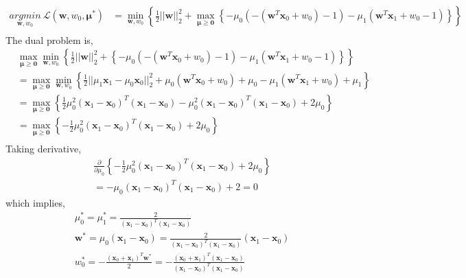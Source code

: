 \documentclass[11pt]{article}
\begin{document}
\begin{equation}
\begin{split}
\underset{\pmb{w},w_0}{argmin}\ \mathcal{L}(\pmb{w},w_0,\pmb{\mu}^*) &= \min_{\pmb{w}, w_0} \left\{\frac{1}{2}||\pmb{w}||^2_2 + \max_{\pmb{\mu}\ge\pmb{0}}\left\{- \mu_0(-(\pmb{w}^T\pmb{x}_0+w_0)-1) - \mu_1(\pmb{w}^T\pmb{x}_1+w_0-1)\right\}\right\}\\
\end{split}
\end{equation} 
The dual problem is,
\begin{equation}
\begin{split}
&\max_{\pmb{\mu}\ge\pmb{0}}\min_{\pmb{w}, w_0} \left\{\frac{1}{2}||\pmb{w}||^2_2 +\left\{- \mu_0(-(\pmb{w}^T\pmb{x}_0+w_0)-1) - \mu_1(\pmb{w}^T\pmb{x}_1+w_0-1)\right\}\right\}\\
&=\max_{\pmb{\mu}\ge\pmb{0}}\min_{\pmb{w}, w_0} \left\{\frac{1}{2}||\mu_1\pmb{x}_1-\mu_0\pmb{x}_0||^2_2+\mu_0(\pmb{w}^T\pmb{x}_0+w_0)+\mu_0 - \mu_1(\pmb{w}^T\pmb{x}_1+w_0)+\mu_1\right\}\\
&=\max_{\pmb{\mu}\ge\pmb{0}} \left\{\frac{1}{2}\mu_0^2(\pmb{x}_1-\pmb{x}_0)^T(\pmb{x}_1-\pmb{x}_0)-\mu_0^2(\pmb{x}_1-\pmb{x}_0)^T(\pmb{x}_1-\pmb{x}_0)+2\mu_0 \right\}\\
&=\max_{\pmb{\mu}\ge\pmb{0}} \left\{-\frac{1}{2}\mu_0^2(\pmb{x}_1-\pmb{x}_0)^T(\pmb{x}_1-\pmb{x}_0)+2\mu_0 \right\}\\
\end{split}
\end{equation}
Taking derivative,
\begin{equation}
\begin{split}
&\frac{\partial }{\partial \mu_0}\left\{-\frac{1}{2}\mu_0^2(\pmb{x}_1-\pmb{x}_0)^T(\pmb{x}_1-\pmb{x}_0)+2\mu_0 \right\}\\
&=-\mu_0(\pmb{x}_1-\pmb{x}_0)^T(\pmb{x}_1-\pmb{x}_0)+2 = 0 
\end{split}
\end{equation}
which implies,
\begin{equation}
\begin{split}
&\mu_0^* = \mu_1^* = \frac{2}{(\pmb{x}_1-\pmb{x}_0)^T(\pmb{x}_1-\pmb{x}_0)}\\
&\pmb{w}^* = \mu_0(\pmb{x}_1-\pmb{x}_0) = \frac{2}{(\pmb{x}_1-\pmb{x}_0)^T(\pmb{x}_1-\pmb{x}_0)} (\pmb{x}_1-\pmb{x}_0)\\
&w_0^* = -\frac{(\pmb{x}_0 + \pmb{x}_1)^T\pmb{w}^*}{2} = -\frac{(\pmb{x}_0 + \pmb{x}_1)^T(\pmb{x}_1-\pmb{x}_0)}{(\pmb{x}_1-\pmb{x}_0)^T(\pmb{x}_1-\pmb{x}_0)}
\end{split}
\end{equation}
\pagebreak
\end{document}
